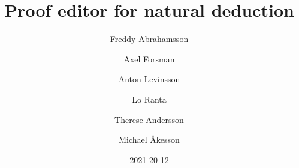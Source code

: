 \usepackage[T1]{fontenc}
\usepackage[utf8]{inputenc}
\usepackage[backend=biber, style=ieee]{biblatex}
\usepackage[colorlinks,allcolors=blue]{hyperref}
\usepackage{enumitem}
\usepackage[xindy]{glossaries}

\makeglossaries
{}



\setlength{\parindent}{0em}
\setlength{\parskip}{1em}

\title{Proof editor for natural deduction}
\date{2021-20-12}
\author{Freddy Abrahamsson \and
    Axel Forsman\and
    Anton Levinsson\and
    Lo Ranta\and
    Therese Andersson \and
    Michael Åkesson}